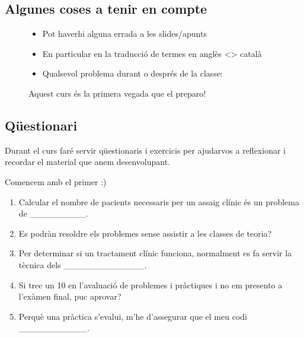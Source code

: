 \documentclass[letterpaper,10pt,english]{sphinxmanual}
\let\sphinxpxdimen\pdfpxdimen\else\newdimen\sphinxpxdimen
\begin{document}
\subsection{Algunes coses a tenir en compte}
\label{\detokenize{0_Intro/0_0_Intro_curs:algunes-coses-a-tenir-en-compte}}
\begin{figure}[htbp]
\centering
\capstart

\noindent\sphinxincludegraphics[height=300\sphinxpxdimen]{{we_need_you}.jpg}
\caption{Aquest curs és la primera vegada que el preparo!}\label{\detokenize{0_Intro/0_0_Intro_curs:id4}}
\begin{sphinxlegend}\begin{itemize}
\item {} 
Pot haver\sphinxhyphen{}hi alguna errada a les slides/apunts

\item {} 
En particular en la traducció de termes en anglès \textless{}\textendash{}\textgreater{} català

\item {} 
Qualsevol problema durant o després de la classe: 

\end{itemize}
\end{sphinxlegend}
\end{figure}


\subsection{Qüestionari}
\label{\detokenize{0_Intro/0_0_Intro_curs:questionari}}
Durant el curs faré servir qüestionaris i exercicis per ajudar\sphinxhyphen{}vos a reflexionar i recordar
el material que anem desenvolupant.

Comencem amb el primer :)
\begin{enumerate}
%
\item {} 
Calcular el nombre de pacients necessaris per un assaig clínic és un problema de \_\_\_\_\_\_\_\_\_.

\item {} 
Es podràn resoldre els problemes sense assistir a les classes de teoria?

\item {} 
Per determinar si un tractament clínic funciona, normalment es fa servir la tècnica dels \_\_\_\_\_\_\_\_\_\_\_\_\_.

\item {} 
Si trec un 10 en l’avaluació de problemes i pràctiques i no em presento a l’exàmen final, puc aprovar?

\item {} 
Perquè una pràctica s’evalui, m’he d’assegurar que el meu codi \_\_\_\_\_\_\_\_\_\_\_.

\end{enumerate}
\end{document}
